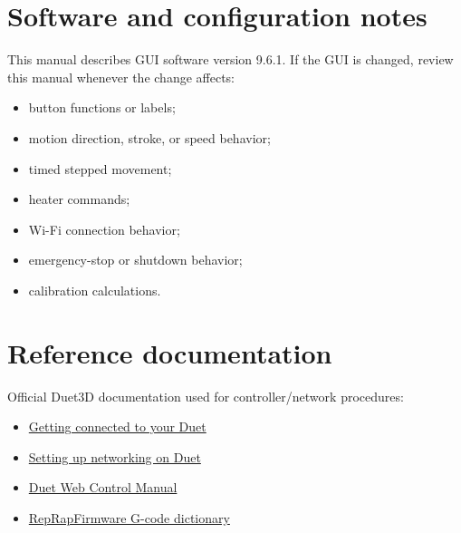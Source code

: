 \documentclass[11pt,a4paper]{article}
\newcommand{\softwareversion}{9.6.1}
\begin{document}
\section{Software and configuration notes}

This manual describes GUI software version \softwareversion. If the GUI is changed, review this manual whenever the change affects:
\begin{itemize}
  \item button functions or labels;
  \item motion direction, stroke, or speed behavior;
  \item timed stepped movement;
  \item heater commands;
  \item Wi-Fi connection behavior;
  \item emergency-stop or shutdown behavior;
  \item calibration calculations.
\end{itemize}

\section{Reference documentation}

Official Duet3D documentation used for controller/network procedures:
\begin{itemize}
  \item \href{https://docs.duet3d.com/How_to_guides/Getting_connected/Getting_connected_to_your_Duet}{Getting connected to your Duet}
  \item \href{https://docs.duet3d.com/en/User_manual/Machine_configuration/Networking}{Setting up networking on Duet}
  \item \href{https://docs.duet3d.com/User_manual/Reference/Duet_Web_Control_Manual}{Duet Web Control Manual}
  \item \href{https://docs.duet3d.com/User_manual/Reference/Gcodes}{RepRapFirmware G-code dictionary}
\end{itemize}
\end{document}
